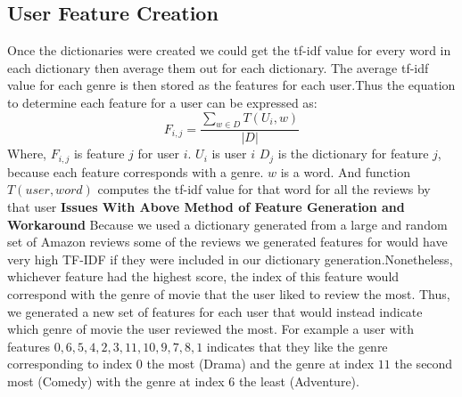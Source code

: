 \documentclass{article}
\begin{document}
\subsection{User Feature Creation}
Once the dictionaries were created we could get the tf-idf value for every word in each dictionary then average them out for each dictionary. The average tf-idf value for each genre is then stored as the features for each user.Thus the equation to determine each feature for a user can be expressed as:
$$F_{i,j} = \frac{\sum\limits_{w \in D} T(U_i, w)}{|D|}$$
Where, $F_{i,j}$ is feature $j$ for user $i$.\newline
$U_i$ is user $i$\newline
$D_j$ is the dictionary for feature $j$, because each feature corresponds with a genre. \newline
$w$ is a word. \newline
And function $T(user, word)$ computes the tf-idf value for that word for all the reviews by that user\newline\newline
\textbf{Issues With Above Method of Feature Generation and Workaround}\newline
Because we used a dictionary generated from a large and random set of Amazon reviews some of the reviews we generated features for would have very high TF-IDF if they were included in our dictionary generation.Nonetheless, whichever feature had the highest score, the index of this feature would correspond with the genre of movie that the user liked to review the most. Thus, we generated a new set of features for each user that would instead indicate which genre of movie the user reviewed the most. For example a user with features $0,6,5,4,2,3,11,10,9,7,8,1$ indicates that they like the genre corresponding to index $0$ the most (Drama) and the genre at index $11$ the second most (Comedy) with the genre at index $6$ the least (Adventure).  
\end{document}
